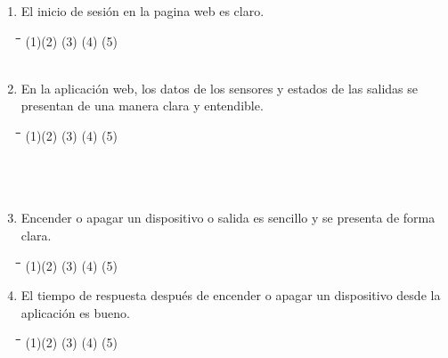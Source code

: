 \documentclass[]{proc}
\begin{document}
\begin{enumerate}
	\item El inicio de sesión en la pagina web es claro.
	
	\begin{tabbing}
		\hspace{1cm}\=\hspace{1cm}\=\hspace{1cm}\=\hspace{1cm}\=\kill
		(1)\>(2)  \>(3)  \>(4)  \>(5) \\\\
	\end{tabbing} 
	
	\item En la aplicación web, los datos de los sensores y estados de las salidas se presentan de una manera clara y entendible.
	
	\begin{tabbing}
		\hspace{1cm}\=\hspace{1cm}\=\hspace{1cm}\=\hspace{1cm}\=\kill
		(1)\>(2)  \>(3)  \>(4)  \>(5) \\\\\\\\
	\end{tabbing} 
	
	\item Encender o apagar un dispositivo o salida es sencillo y se presenta de forma clara.
	
	\begin{tabbing}
		\hspace{1cm}\=\hspace{1cm}\=\hspace{1cm}\=\hspace{1cm}\=\kill
		(1)\>(2)  \>(3)  \>(4)  \>(5) \\
	\end{tabbing} 

	\item El tiempo de respuesta después de encender o apagar un dispositivo desde la aplicación es bueno.
	
	\begin{tabbing}
		\hspace{1cm}\=\hspace{1cm}\=\hspace{1cm}\=\hspace{1cm}\=\kill
		(1)\>(2)  \>(3)  \>(4)  \>(5) \\\\
	\end{tabbing} 
	

\end{enumerate}
\end{document}
